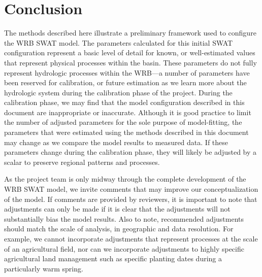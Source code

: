 \section{Conclusion}
The methods described here illustrate a preliminary framework used to configure the WRB SWAT model. The parameters calculated for this initial SWAT configuration represent a basic level of detail for known, or well-estimated values that represent physical processes within the basin. These parameters do not fully represent hydrologic processes within the WRB---a number of parameters have been reserved for calibration, or future estimation as we learn more about the hydrologic system during the calibration phase of the project. During the calibration phase, we may find that the model configuration described in this document are inappropriate or inaccurate. Although it is good practice to limit the number of adjusted parameters for the sole purpose of model-fitting, the parameters that were estimated using the methods described in this document may change as we compare the model results to measured data. If these parameters change during the calibration phase, they will likely be adjusted by a scalar to preserve regional patterns and processes.

As the project team is only midway through the complete development of the WRB SWAT model, we invite comments that may improve our conceptualization of the model. If comments are provided by reviewers, it is important to note that adjustments can only be made if it is clear that the adjustments will not substantially bias the model results. Also to note, recommended adjustments should match the scale of analysis, in geographic and data resolution. For example, we cannot incorporate adjustments that represent processes at the scale of an agricultural field, nor can we incorporate adjustments to highly specific agricultural land management such as specific planting dates during a particularly warm spring.

\pagebreak